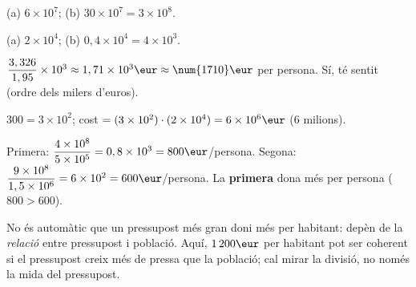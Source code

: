 \begin{solucions}
\begin{sollist}
  \item (a) $6\times 10^{7}$; \quad (b) $30\times 10^{7}=3\times 10^{8}$.
  \item (a) $2\times 10^{4}$; \quad (b) $0,4\times 10^{4}=4\times 10^{3}$.
  \item $\dfrac{3,326}{1,95}\times 10^{3}\approx 1,71\times 10^{3}\eur\approx\num{1710}\eur$
        per persona. Sí, té sentit (ordre dels milers d'euros).
  \item $300=3\times 10^{2}$; cost $=(3\times 10^{2})\cdot(2\times 10^{4})=6\times 10^{6}\eur$
        ($6$ milions).
  \item Primera: $\dfrac{4\times 10^{8}}{5\times 10^{5}}=0,8\times 10^{3}=800\eur$/persona.
        Segona: $\dfrac{9\times 10^{8}}{1,5\times 10^{6}}=6\times 10^{2}=600\eur$/persona.
        La \textbf{primera} dona més per persona ($800>600$).
  \item No és automàtic que un pressupost més gran doni més per habitant: depèn de la
        \emph{relació} entre pressupost i població. Aquí, $1\,200\eur$ per habitant pot
        ser coherent si el pressupost creix més de pressa que la població; cal mirar la
        divisió, no només la mida del pressupost.
\end{sollist}
\end{solucions}
